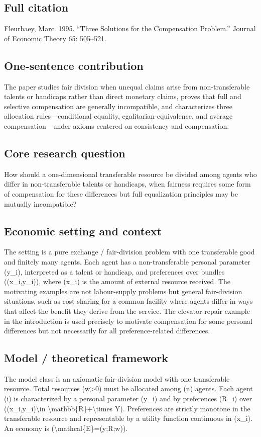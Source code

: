 \documentclass[11pt,a4paper]{article}
\begin{document}
\subsection*{Full citation}
Fleurbaey, Marc. 1995. “Three Solutions for the Compensation Problem.” Journal of Economic Theory 65: 505–521.

\subsection*{One-sentence contribution}
The paper studies fair division when unequal claims arise from non-transferable talents or handicaps rather than direct monetary claims, proves that full and selective compensation are generally incompatible, and characterizes three allocation rules—conditional equality, egalitarian-equivalence, and average compensation—under axioms centered on consistency and compensation.

\subsection*{Core research question}
How should a one-dimensional transferable resource be divided among agents who differ in non-transferable talents or handicaps, when fairness requires some form of compensation for these differences but full equalization principles may be mutually incompatible?

\subsection*{Economic setting and context}
The setting is a pure exchange / fair-division problem with one transferable good and finitely many agents. Each agent has a non-transferable personal parameter (y\_i), interpreted as a talent or handicap, and preferences over bundles ((x\_i,y\_i)), where (x\_i) is the amount of external resource received. The motivating examples are not labour-supply problems but general fair-division situations, such as cost sharing for a common facility where agents differ in ways that affect the benefit they derive from the service. The elevator-repair example in the introduction is used precisely to motivate compensation for some personal differences but not necessarily for all preference-related differences.

\subsection*{Model / theoretical framework}
The model class is an axiomatic fair-division model with one transferable resource. Total resources (w>0) must be allocated among (n) agents. Each agent (i) is characterized by a personal parameter (y\_i) and by preferences (R\_i) over ((x\_i,y\_i)\textbackslash{}in \textbackslash{}mathbb\{R\}+\textbackslash{}times Y). Preferences are strictly monotone in the transferable resource and representable by a utility function continuous in (x\_i). An economy is (\textbackslash{}mathcal\{E\}=(y;R;w)).
\end{document}
